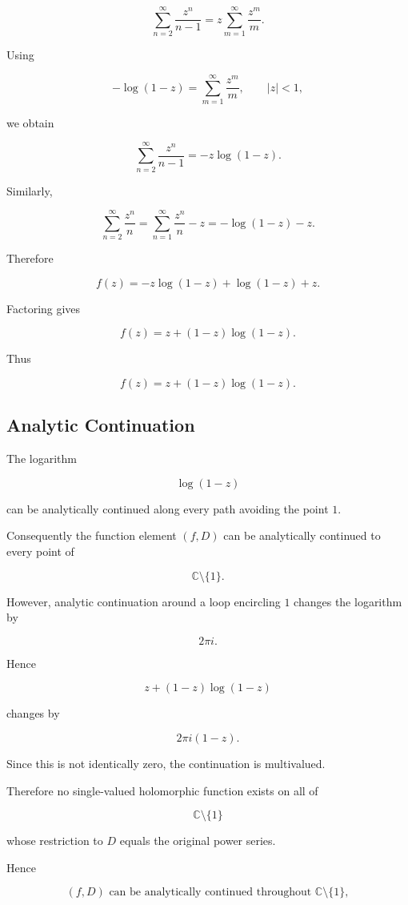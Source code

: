 \documentclass[12pt,a4paper]{article}
\theoremstyle{notespace}
\begin{document}
\[
\sum_{n=2}^{\infty}\frac{z^n}{n-1}
=
z\sum_{m=1}^{\infty}\frac{z^m}{m}.
\]

Using

\[
-\log(1-z)
=
\sum_{m=1}^{\infty}\frac{z^m}{m},
\qquad |z|<1,
\]

we obtain

\[
\sum_{n=2}^{\infty}\frac{z^n}{n-1}
=
-z\log(1-z).
\]

Similarly,

\[
\sum_{n=2}^{\infty}\frac{z^n}{n}
=
\sum_{n=1}^{\infty}\frac{z^n}{n}-z
=
-\log(1-z)-z.
\]

Therefore

\[
f(z)
=
-z\log(1-z)
+
\log(1-z)
+
z.
\]

Factoring gives

\[
f(z)
=
z+(1-z)\log(1-z).
\]

Thus

\[
\boxed{
	f(z)=z+(1-z)\log(1-z).
}
\]

\subsection*{Analytic Continuation}

The logarithm

\[
\log(1-z)
\]

can be analytically continued along every path avoiding the point \(1\).

Consequently the function element \((f,D)\) can be analytically continued to every point of

\[
\mathbb C\setminus\{1\}.
\]

However, analytic continuation around a loop encircling \(1\) changes the logarithm by

\[
2\pi i.
\]

Hence

\[
z+(1-z)\log(1-z)
\]

changes by

\[
2\pi i(1-z).
\]

Since this is not identically zero, the continuation is multivalued.

Therefore no single-valued holomorphic function exists on all of

\[
\mathbb C\setminus\{1\}
\]

whose restriction to \(D\) equals the original power series.

Hence

\[
\boxed{
	(f,D)
	\text{ can be analytically continued throughout }
	\mathbb C\setminus\{1\},
}
\]
\end{document}
